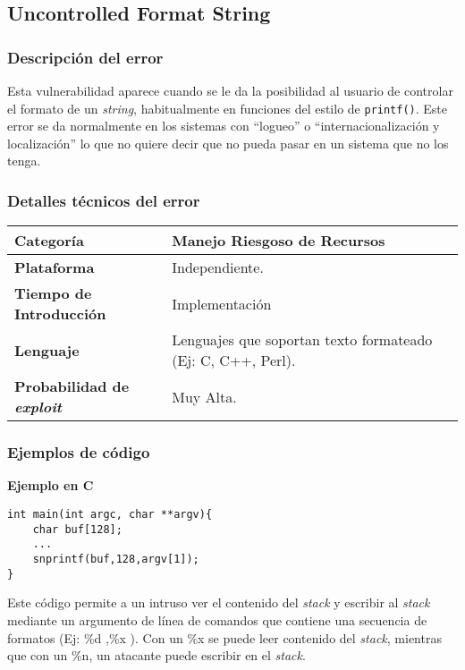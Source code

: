 \subsection{Uncontrolled Format String}

\subsubsection{Descripción del error}

Esta vulnerabilidad aparece cuando se le da la posibilidad al usuario de controlar el
formato de un \textit{string}, habitualmente en funciones del estilo de \texttt{printf()}.
Este error se da normalmente en los sistemas con ``logueo'' o ``internacionalización y
localización'' lo que no quiere decir que no pueda pasar en un sistema que no los tenga.

\subsubsection{Detalles técnicos del error}
\begin{tabular}[\baselineskip]{|l|p{7cm}|}
  \hline
  \textbf{Categoría} & Manejo Riesgoso de Recursos \\
  \hline
  \textbf{Plataforma} & Independiente. \\
  \hline
  \textbf{Tiempo de Introducción} & Implementación \\
  \hline
  \textbf{Lenguaje} & Lenguajes que soportan texto formateado (Ej: C, C++, Perl). \\
  \hline
  \textbf{Probabilidad de \emph{exploit}} & Muy Alta. \\
  \hline
\end{tabular}

\subsubsection{Ejemplos de código}

\noindent \textbf{Ejemplo en C}\\

\begin{lstlisting}[frame=single]
int main(int argc, char **argv){
	char buf[128];
	...
	snprintf(buf,128,argv[1]);
}
\end{lstlisting}

Este código permite a un intruso ver el contenido del \textit{stack} y escribir al \textit{stack} mediante un argumento de línea de comandos que contiene una secuencia de formatos (Ej: \%d ,\%x ).
Con un \%x se puede leer contenido del \textit{stack}, mientras que con un \%n, un atacante puede escribir en el \textit{stack}.

